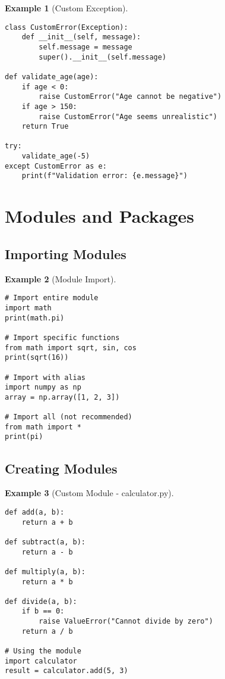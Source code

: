 \documentclass[11pt]{article}
\newtheorem{example}{Example}[section]
\begin{document}
\begin{example}[Custom Exception]
\begin{lstlisting}
class CustomError(Exception):
    def __init__(self, message):
        self.message = message
        super().__init__(self.message)

def validate_age(age):
    if age < 0:
        raise CustomError("Age cannot be negative")
    if age > 150:
        raise CustomError("Age seems unrealistic")
    return True

try:
    validate_age(-5)
except CustomError as e:
    print(f"Validation error: {e.message}")
\end{lstlisting}
\end{example}

\section{Modules and Packages}

\subsection{Importing Modules}

\begin{example}[Module Import]
\begin{lstlisting}
# Import entire module
import math
print(math.pi)

# Import specific functions
from math import sqrt, sin, cos
print(sqrt(16))

# Import with alias
import numpy as np
array = np.array([1, 2, 3])

# Import all (not recommended)
from math import *
print(pi)
\end{lstlisting}
\end{example}

\subsection{Creating Modules}

\begin{example}[Custom Module - calculator.py]
\begin{lstlisting}
def add(a, b):
    return a + b

def subtract(a, b):
    return a - b

def multiply(a, b):
    return a * b

def divide(a, b):
    if b == 0:
        raise ValueError("Cannot divide by zero")
    return a / b

# Using the module
import calculator
result = calculator.add(5, 3)
\end{lstlisting}
\end{example}
\end{document}
